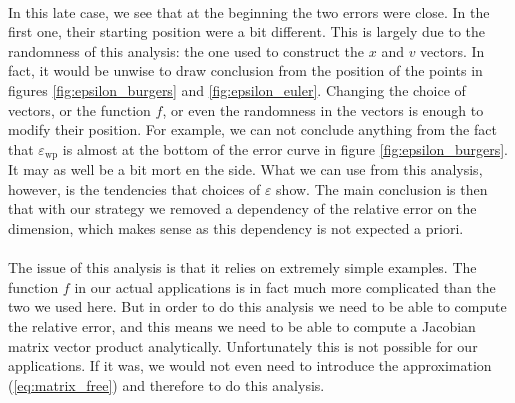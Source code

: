       \paragraph{}
      In this late case, we see that at the beginning the two errors were close.
      In the first one, their starting position were a bit different.
      This is largely due to the randomness of this analysis: the one used to construct the $x$ and $v$ vectors.
      In fact, it would be unwise to draw conclusion from the position of the points in figures \ref{fig:epsilon_burgers} and \ref{fig:epsilon_euler}.
      Changing the choice of vectors, or the function $f$, or even the randomness in the vectors is enough to modify their position.
      For example, we can not conclude anything from the fact that $\varepsilon_\textrm{wp}$ is almost at the bottom of the error curve in figure \ref{fig:epsilon_burgers}.
      It may as well be a bit mort en the side.
      What we can use from this analysis, however, is the tendencies that choices of $\varepsilon$ show.
      The main conclusion is then that with our strategy we removed a dependency of the relative error on the dimension, which makes sense as this dependency is not expected a priori.

      \paragraph{}
      The issue of this analysis is that it relies on extremely simple examples.
      The function $f$ in our actual applications is in fact much more complicated than the two we used here.
      But in order to do this analysis we need to be able to compute the relative error, and this means we need to be able to compute a Jacobian matrix vector product analytically.
      Unfortunately this is not possible for our applications.
      If it was, we would not even need to introduce the approximation (\ref{eq:matrix_free}) and therefore to do this analysis.
